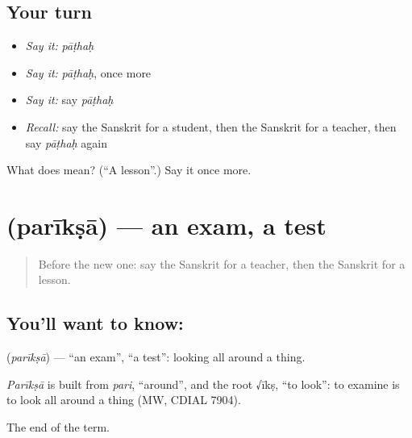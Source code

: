 \subsection*{Your turn}
\begin{itemize}
\raggedright
  \item \emph{Say it:} \emph{pāṭhaḥ}
  \item \emph{Say it:} \emph{pāṭhaḥ}, once more
  \item \emph{Say it:} say \emph{pāṭhaḥ}
  \item \emph{Recall:} say the Sanskrit for a student, then the Sanskrit for a teacher, then say \emph{pāṭhaḥ} again
\end{itemize}

\begin{tcolorbox}[breakable,colback=teal!4,colframe=teal!35!black,title={Before you move on}]
What does  mean? (\textquotedblleft{}A lesson\textquotedblright{}.) Say it once more.
\end{tcolorbox}
\section[\texorpdfstring{\sk{परीक्षा} (parīkṣā)}{परीक्षा (parīkṣā)}]{ (parīkṣā) — an exam, a test}

\label{lesson:SA-C83-exam}



\begin{quote}
Before the new one: say the Sanskrit for a teacher, then the Sanskrit for a lesson.
\end{quote}

\subsection*{You'll want to know: }
\textbf{} (\emph{parīkṣā}) — \textquotedblleft{}an exam\textquotedblright{}, \textquotedblleft{}a test\textquotedblright{}: looking all around a thing.

\begin{cousinweb}
\emph{Parīkṣā} is built from \emph{pari}, \textquotedblleft{}around\textquotedblright{}, and the root √īkṣ, \textquotedblleft{}to look\textquotedblright{}: to examine is to look all around a thing (MW, CDIAL 7904).
\end{cousinweb}

\begin{grammarlens}[title={What you've built}]
The end of the term.
\end{grammarlens}

